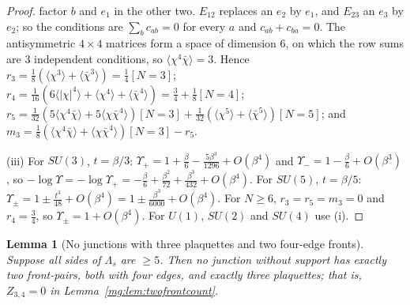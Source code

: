 \documentclass[11pt,a4paper]{article}
\newtheorem{lemma}[theorem]{Lemma}
\theoremstyle{definition}
\theoremstyle{remark}
\begin{document}
\begin{proof}
factor $b$ and $e_1$ in the other two. $E_{12}$ replaces an $e_2$ by $e_1$, and $E_{23}$ an $e_3$ by $e_2$; so the conditions are $\sum_bc_{ab}=0$ for every $a$
and $c_{ab}+c_{ba}=0$. The antisymmetric $4\times4$ matrices form a space of dimension $6$, on which the row sums are $3$ independent conditions, so
$\langle\chi^4\bar\chi\rangle=3$. Hence $r_3=\frac18(\langle\chi^3\rangle+\langle\bar\chi^3\rangle)=\frac14[N=3]$;
$r_4=\frac1{16}(6\langle|\chi|^4\rangle+\langle\chi^4\rangle+\langle\bar\chi^4\rangle)=\frac34+\frac18[N=4]$;
$r_5=\frac1{32}(5\langle\chi^4\bar\chi\rangle+5\langle\chi\bar\chi^4\rangle)[N=3]+\frac1{32}(\langle\chi^5\rangle+\langle\bar\chi^5\rangle)[N=5]$;
and $m_3=\frac18(\langle\chi^4\bar\chi\rangle+\langle\chi\bar\chi^4\rangle)[N=3]-r_5$.

(iii) For $SU(3)$, $t=\beta/3$: $\Upsilon_+=1+\frac\beta6-\frac{5\beta^3}{1296}+O(\beta^4)$ and $\Upsilon_-=1-\frac\beta6+O(\beta^3)$, so
$-\log\Upsilon=-\log\Upsilon_+=-\frac\beta6+\frac{\beta^2}{72}+\frac{\beta^3}{432}+O(\beta^4)$. For $SU(5)$, $t=\beta/5$: $\Upsilon_\pm=1\pm\frac{t^3}{48}+O(\beta^4)=1\pm\frac{\beta^3}{6000}+O(\beta^4)$.
For $N\ge6$, $r_3=r_5=m_3=0$ and $r_4=\frac34$, so $\Upsilon_\pm=1+O(\beta^4)$. For $U(1)$, $SU(2)$ and $SU(4)$ use (i).
\end{proof}

\begin{lemma}[No junctions with three plaquettes and two four-edge fronts]\label{mg:lem:threeplaq}
Suppose all sides of $\Lambda_s$ are $\ge5$. Then no junction without support has exactly two front-pairs, both with four edges, and exactly three
plaquettes; that is, $Z_{3,4}=0$ in Lemma~\ref{mg:lem:twofrontcount}.
\end{lemma}
\end{document}
